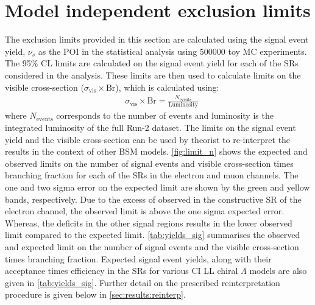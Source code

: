 \section{Model independent exclusion limits}
The exclusion limits provided in this section are calculated using the signal event yield, $\nu_s$ as the POI in the statistical analysis using 500000 toy MC experiments. The 95\% CL limits are calculated on the signal event yield for each of the SRs considered in the analysis. These limits are then used to calculate limits on the visible cross-section ($\sigma_\textrm{vis}\times\textrm{Br}$), which is calculated using:
\begin{equation}
    \label{eq:visxs}
    \begin{aligned}
        & \sigma_\textrm{vis}\times\textrm{Br} = \frac{N_{\mathrm{events}}}{\mathrm{Luminosity}}
    \end{aligned}
\end{equation}
where $N_{\mathrm{events}}$ corresponds to the number of events and luminosity is the integrated luminosity of the full Run-2 dataset. The limits on the signal event yield and the visible cross-section can be used by theorist to re-interpret the results in the context of other BSM models. \cref{fig:limit_n} shows the expected and observed limits on the number of signal events and visible cross-section times branching fraction for each of the SRs in the electron and muon channels. The one and two sigma error on the expected limit are shown by the green and yellow bands, respectively. Due to the excess of observed in the constructive SR of the electron channel, the observed limit is above the one sigma expected error. Whereas, the deficits in the other signal regions results in the lower observed limit compared to the expected limit. \cref{tab:yields_sig} summarises the observed and expected limit on the number of signal events and the visible cross-section times branching fraction. Expected signal event yields, along with their acceptance times efficiency in the SRs for various CI LL chiral $\Lambda$ models are also given in \cref{tab:yields_sig}. Further detail on the prescribed reinterpretation procedure is given below in \cref{sec:results:reinterp}.

